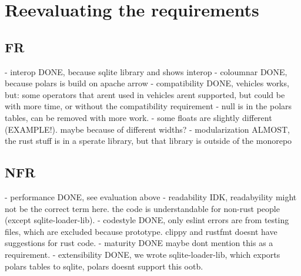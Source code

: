 \section{Reevaluating the requirements}
\subsection{FR}
- interop DONE, because sqlite library and shows interop
- coloumnar DONE, because polars is build on apache arrow
- compatibility DONE, vehicles works, but: some operators that arent used in vehicles arent supported, but could be with more time, or without the compatibility requirement
- null is in the polars tables, can be removed with more work.
- some floats are slightly different (EXAMPLE!). maybe because of different widths?
- modularization ALMOST, the rust stuff is in a sperate library, but that library is outside of the monorepo

\subsection{NFR}
- performance DONE, see evaluation above
- readability IDK, readabyility might not be the correct term here.
the code is understandable for non-rust people (except sqlite-loader-lib).
- codestyle DONE, only eslint errors are from testing files, which are excluded because prototype.
clippy and rustfmt doesnt have suggestions for rust code.
- maturity DONE maybe dont mention this as a requirement.
- extensibility DONE, we wrote sqlite-loader-lib, which exports polars tables to sqlite, polars doesnt support this ootb.
